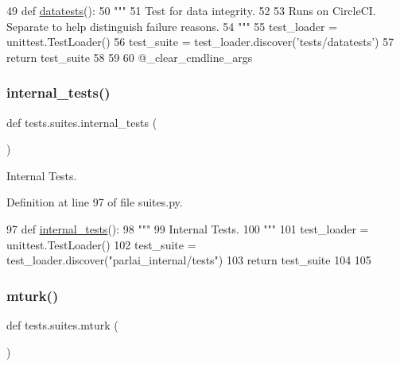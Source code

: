 \begin{DoxyCode}
49 \textcolor{keyword}{def }\hyperlink{namespacetests_1_1suites_a1e7ee73a4d3645058850bc743ad6b668}{datatests}():
50     \textcolor{stringliteral}{"""}
51 \textcolor{stringliteral}{    Test for data integrity.}
52 \textcolor{stringliteral}{}
53 \textcolor{stringliteral}{    Runs on CircleCI. Separate to help distinguish failure reasons.}
54 \textcolor{stringliteral}{    """}
55     test\_loader = unittest.TestLoader()
56     test\_suite = test\_loader.discover(\textcolor{stringliteral}{'tests/datatests'})
57     \textcolor{keywordflow}{return} test\_suite
58 
59 
60 @\_clear\_cmdline\_args
\end{DoxyCode}
\mbox{\label{namespacetests_1_1suites_aaa84dd961fb392c540b3a116119be21c}} 
\subsubsection{\texorpdfstring{internal\+\_\+tests()}{internal\_tests()}}
{\footnotesize\ttfamily def tests.\+suites.\+internal\+\_\+tests (\begin{DoxyParamCaption}{ }\end{DoxyParamCaption})}

\begin{DoxyVerb}Internal Tests.
\end{DoxyVerb}
 

Definition at line 97 of file suites.\+py.


\begin{DoxyCode}
97 \textcolor{keyword}{def }\hyperlink{namespacetests_1_1suites_aaa84dd961fb392c540b3a116119be21c}{internal\_tests}():
98     \textcolor{stringliteral}{"""}
99 \textcolor{stringliteral}{    Internal Tests.}
100 \textcolor{stringliteral}{    """}
101     test\_loader = unittest.TestLoader()
102     test\_suite = test\_loader.discover(\textcolor{stringliteral}{"parlai\_internal/tests"})
103     \textcolor{keywordflow}{return} test\_suite
104 
105 
\end{DoxyCode}
\mbox{\label{namespacetests_1_1suites_a5d5a0bb14f72dd9c86a97cc6ca6add87}} 
\subsubsection{\texorpdfstring{mturk()}{mturk()}}
{\footnotesize\ttfamily def tests.\+suites.\+mturk (\begin{DoxyParamCaption}{ }\end{DoxyParamCaption})}

